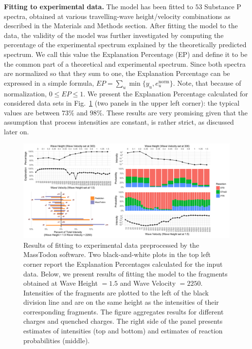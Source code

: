 \documentclass{llncs}
\begin{document}
        \textbf{Fitting to experimental data.} The model has been fitted to $53$ Substance P spectra, obtained at various travelling-wave height/velocity combinations as described in the Materials and Methods section. After fitting the model to the data, the validity of the model was further investigated by computing the percentage of the experimental spectrum explained by the theoretically predicted spectrum. We call this value the Explanation Percentage (EP) and define it to be the common part of a theoretical and experimental spectrum. Since both spectra are normalized so that they sum to one, the Explanation Percentage can be expressed in a simple formula,
        $ EP = \sum_u \min\{y_u, e_u^\text{norm}\}.$
        Note, that because of normalization, $0 \leq EP \leq 1$. We present the Explanation Percentage calculated for considered data sets in Fig.~\ref{fig::melon} (two panels in the upper left corner): the typical values are between $73\%$ and $98\%$. These results are very promising given that the assumption that process intensities are constant, is rather strict, as discussed later on.

        \begin{figure}[h]
                \center
                \includegraphics[width=\textwidth]{melon.png}
                \caption{ Results of fitting to experimental data preprocessed by the MassTodon software. Two black-and-white plots in the top left corner report the Explanation Percentages calculated for the input data. Below, we present results of fitting the model to the fragments obtained at Wave Height $= 1.5$ and Wave Velocity $= 2250$. Intensities of the  fragments are plotted to the left of the black division line and are on the same height as the intensities of their corresponding  fragments. The figure aggregates results for different charges and quenched charges. The right side of the panel presents estimates of intensities (top and bottom) and estimates of reaction probabilities (middle).
                }\label{fig::melon}
        \end{figure}
\end{document}
